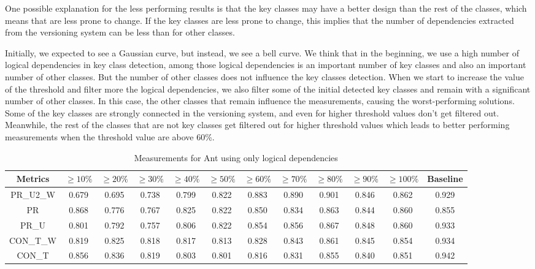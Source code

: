 \documentclass[runningheads]{comsis2}
\begin{document}
One possible explanation for the less performing results is that the key classes may have a better design than the rest of the classes, which means that are less prone to change. If the key classes are less prone to change, this implies that the number of dependencies extracted from the versioning system can be less than for other classes.


Initially, we expected to see a Gaussian curve, but instead, we see a bell curve.  We think that in the beginning, we use a high number of logical dependencies in key class detection, among those logical dependencies is an important number of key classes and also an important number of other classes. But the number of other classes does not influence the key classes detection. When we start to increase the value of the threshold and filter more the logical dependencies, we also filter some of the initial detected key classes and remain with a significant number of other classes. In this case, the other classes that remain influence the measurements, causing the worst-performing solutions. 
Some of the key classes are strongly connected in the versioning system, and even for higher threshold values don't get filtered out. Meanwhile, the rest of the classes that are not key classes get filtered out for higher threshold values which leads to better performing measurements when the threshold value are above 60\%. 

\begin{table}[!h]
\renewcommand{\arraystretch}{1}
\caption{Measurements for Ant using only logical dependencies}
\label{tab:measurementshistory:ant}
\centering
\begin{tabular}{|c|cccccccccc|c|}
\hline
Metrics &	$\geq10\%$	&	$\geq20\%$		&	$\geq30\%$		&	$\geq40\%$		&	$\geq50\%$		&	$\geq60\%$		&	$\geq70\%$		&	$\geq80\%$		&	$\geq90\%$		&	$\geq100\%$		&	Baseline \\
\hline

PR\_U2\_W	&	0.679	&	0.695	&	0.738	&	0.799	&	0.822	&	0.883	&	0.890	&	0.901	&	0.846	&	0.862	&	0.929	\\
PR	&	0.868	&	0.776	&	0.767	&	0.825	&	0.822	&	0.850	&	0.834	&	0.863	&	0.844	&	0.860	&	0.855	\\
PR\_U	&	0.801	&	0.792	&	0.757	&	0.806	&	0.822	&	0.854	&	0.856	&	0.867	&	0.848	&	0.860	&	0.933	\\
CON\_T\_W	&	0.819	&	0.825	&	0.818	&	0.817	&	0.813	&	0.828	&	0.843	&	0.861	&	0.845	&	0.854	&	0.934	\\
CON\_T	&	0.856	&	0.836	&	0.819	&	0.803	&	0.801	&	0.816	&	0.831	&	0.855	&	0.840	&	0.851	&	0.942	\\


\hline
\end{tabular}
\end{table}
\end{document}
